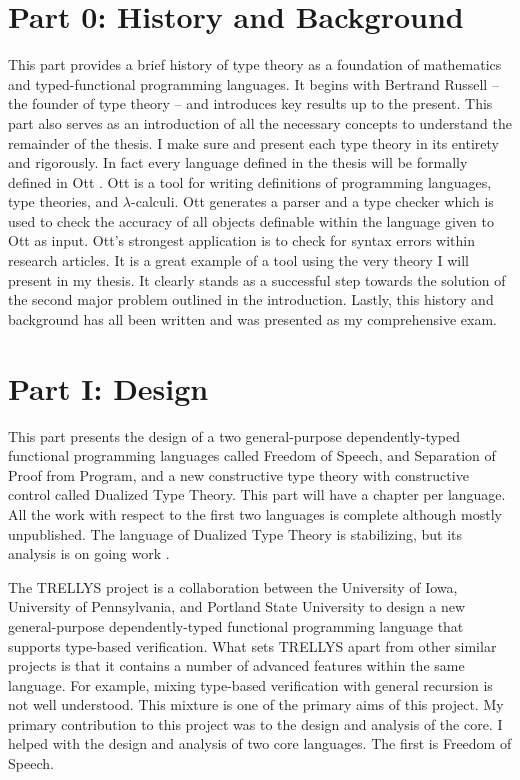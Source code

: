 \section{Part 0: History and Background}
\label{sec:history_and_background}
This part provides a brief history of type theory as a foundation of
mathematics and typed-functional programming languages.  It begins
with Bertrand Russell -- the founder of type theory -- and introduces
key results up to the present. This part also serves as an
introduction of all the necessary concepts to understand the remainder
of the thesis.  I make sure and present each type theory in its
entirety and rigorously.  In fact every language defined in the thesis
will be formally defined in Ott \cite{Sewell:2010}.  Ott is a tool for
writing definitions of programming languages, type theories, and
$\lambda$-calculi.  Ott generates a parser and a type checker which is
used to check the accuracy of all objects definable within the
language given to Ott as input.  Ott's strongest application is to
check for syntax errors within research articles.  It is a great
example of a tool using the very theory I will present in my thesis.
It clearly stands as a successful step towards the solution of the
second major problem outlined in the introduction.  Lastly, this
history and background has all been written and was presented as my
comprehensive exam.

\section{Part I: Design}
\label{sec:design}

This part presents the design of a two general-purpose
dependently-typed functional programming languages called Freedom of
Speech, and Separation of Proof from Program, and a new constructive
type theory with constructive control called Dualized Type Theory.
This part will have a chapter per language. All the work with
respect to the first two languages is complete although mostly
unpublished.  The language of Dualized Type Theory is stabilizing, but
its analysis is on going work \cite{Stump:2013}.

The TRELLYS project is a collaboration between the University of Iowa,
University of Pennsylvania, and Portland State University to design a
new general-purpose dependently-typed functional programming language
that supports type-based verification.  What sets TRELLYS apart from
other similar projects is that it contains a number of advanced
features within the same language.  For example, mixing type-based
verification with general recursion is not well understood.  This
mixture is one of the primary aims of this project.  My primary
contribution to this project was to the design and analysis of the
core.  I helped with the design and analysis of two core languages.
The first is Freedom of Speech.


